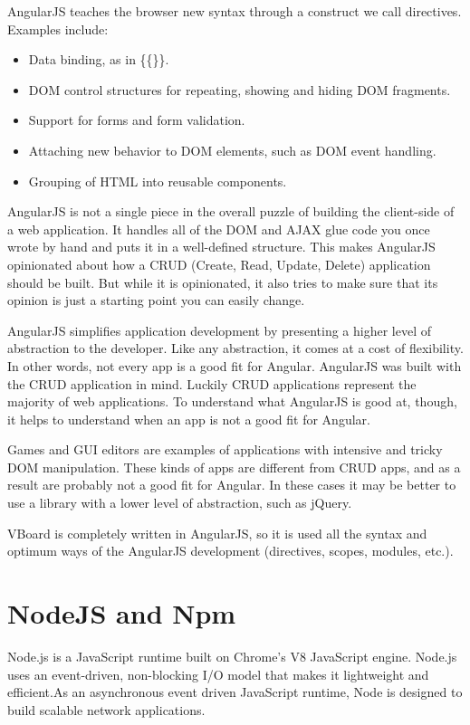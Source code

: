 \documentclass[a4paper, 12pt]{book}
\begin{document}
AngularJS teaches the browser new syntax through a construct we call directives. Examples include:

\begin{itemize}
\item Data binding, as in \{\{\}\}.
\item DOM control structures for repeating, showing and hiding DOM fragments.
\item Support for forms and form validation.
\item Attaching new behavior to DOM elements, such as DOM event handling.
\item Grouping of HTML into reusable components.
\end{itemize}

AngularJS is not a single piece in the overall puzzle of building the client-side of a web application. It handles all of the DOM and AJAX glue code you once wrote by hand and puts it in a well-defined structure. This makes AngularJS opinionated about how a CRUD (Create, Read, Update, Delete) application should be built. But while it is opinionated, it also tries to make sure that its opinion is just a starting point you can easily change.

AngularJS simplifies application development by presenting a higher level of abstraction to the developer. Like any abstraction, it comes at a cost of flexibility. In other words, not every app is a good fit for Angular. AngularJS was built with the CRUD application in mind. Luckily CRUD applications represent the majority of web applications. To understand what AngularJS is good at, though, it helps to understand when an app is not a good fit for Angular.

Games and GUI editors are examples of applications with intensive and tricky DOM manipulation. These kinds of apps are different from CRUD apps, and as a result are probably not a good fit for Angular. In these cases it may be better to use a library with a lower level of abstraction, such as jQuery.

VBoard is completely written in AngularJS, so it is used all the syntax and optimum ways of the AngularJS development (directives, scopes, modules, etc.).

\section{NodeJS and Npm}
\label{sec:nodejsnpm}
Node.js is a JavaScript runtime built on Chrome's V8 JavaScript engine. Node.js uses an event-driven, non-blocking I/O model that makes it lightweight and efficient.As an asynchronous event driven JavaScript runtime, Node is designed to build scalable network applications.
\end{document}
